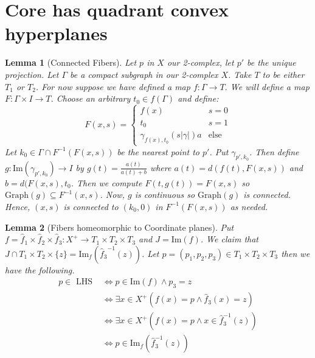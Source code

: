 \documentclass{article}
\theoremstyle{mystyle}
\newtheorem{lem}{Lemma}[section]
\theoremstyle{remark}
\begin{document}
\section{Core has quadrant convex hyperplanes}

\begin{lem}
    [Connected Fibers]
    \label{lem:confib} 
    Let \(p\) in \(X\) our 2-complex, let \(p'\) be the unique projection. Let \(\Gamma\) be a compact subgraph in our 2-complex \(X\).  Take \(T\) to be either \(T_{1}\) or \(T_{2}\). For now suppose we have defined a map \(f: \Gamma \to T\). We will define a map \(F: \Gamma \times I \to T\). Choose an arbitrary \(t_{0} \in f(\Gamma) \) and define: 
    \[ F(x,s) = 
        \begin{cases} 
            f(x)& s=0\\ 
            t_{0} & s=1\\
            \gamma_{f(x),t_{0}} (s | \gamma |)a & \text{else}
        \end{cases}
    \]
    Let \(k_{0} \in \Gamma \cap F^{-1} (F(x,s))\) be the nearest point to \(p'\). Put \(\gamma_{p',k_{0}}\). Then define \(g: \text{Im} (\gamma_{p',k_{0}}) \to I\) by \(g(t) = \frac{a(t)}{a(t)+b}\) where \(a(t) = d(f(t), F(x,s))\) and \(b = d(F(x,s), t_{0}\). Then we compute \(F(t,g(t))=F(x,s)\) so \(\text{Graph}(g) \subseteq F^{-1} (x,s)\). Now, \(g\) is continuous so \(\text{Graph}(g)\) is connected. Hence, \((x,s)\) is connected to \((k_{0} ,0)\) in \(F^{-1} (F(x,s))\) as needed.
\end{lem}
\begin{lem}
    [Fibers homeomorphic to Coordinate planes]



    Put \(f = \hat f_{1} \times \hat f_{2} \times \hat f_{3}: X^{+} \to T_{1} \times T_{2} \times T_{3} \) and \(J = \text{Im}(f)\). We claim that \(J \cap T_{1} \times T_{2} \times \{z\} = \text{Im}_{f} ({\hat f_{3}}^{-1}(z))\). Let \(p = (p_{1}, p_{2} , p_{3}) \in T_{1} \times T_{2} \times T_{3}\) then we have the following. 
    \begin{align*}
        p \in \text { LHS } & \Longleftrightarrow p \in \text{Im}(f) \wedge p_{3} = z \\ 
        & \Longleftrightarrow \exists x \in X^{+} (f(x)=p \wedge \hat f_3(x)=z)\\
        & \Longleftrightarrow \exists x \in X^{+} (f(x)=p \wedge x \in \hat f_3^{-1} (z))\\
        & \Longleftrightarrow p \in \text{Im}_f(\hat f_3^{-1} (z))
    \end{align*}
\end{lem}
\end{document}
